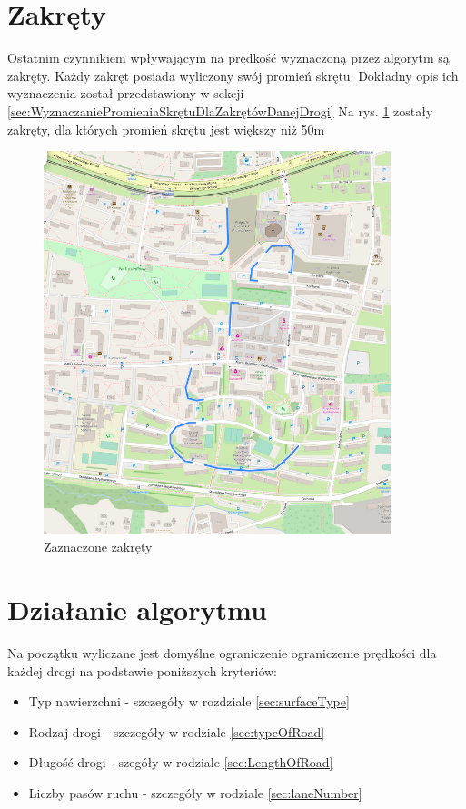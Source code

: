\section{Zakręty}
Ostatnim czynnikiem wpływającym na prędkość wyznaczoną przez algorytm są zakręty. Każdy zakręt posiada wyliczony swój promień skrętu. Dokładny opis ich wyznaczenia został przedstawiony w sekcji \ref{sec:WyznaczaniePromieniaSkrętuDlaZakrętówDanejDrogi}
Na rys. \ref{sec:zakrety} zostały zakręty, dla których promień skrętu jest większy niż 50m
\begin{figure}[h]
\caption{Zaznaczone zakręty}
\label{sec:zakrety}
\centering
\includegraphics[width=0.9\textwidth]{zakrety}
\end{figure}


\newpage
\section{Działanie algorytmu}
\label{sec:speedLimitLocalization}



Na początku wyliczane jest domyślne ograniczenie ograniczenie prędkości dla każdej drogi na podstawie poniższych kryteriów:
\begin{itemize}
\item Typ nawierzchni - szczegóły w rozdziale \ref{sec:surfaceType}
\item Rodzaj drogi - szczegóły w rodziale \ref{sec:typeOfRoad}
\item Długość drogi - szegóły w rodziale \ref{sec:LengthOfRoad}
\item Liczby pasów ruchu - szczegóły w rodziale \ref{sec:laneNumber}
\end{itemize}

